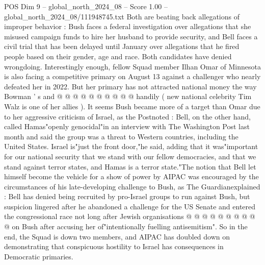 \begin{textsample}{POS Dim 9 – global\_north\_2024\_08 – Score 1.00 – global\_north\_2024\_08/111948745.txt}
Both are beating back allegations of improper behavior : Bush faces a federal investigation over allegations that she misused campaign funds to hire her husband to provide security, and Bell faces a civil trial that has been delayed until January over allegations that he fired people based on their gender, age and race.
Both candidates have denied wrongdoing.
Interestingly enough, fellow Squad member Ilhan Omar of Minnesota is also facing a competitive primary on August 13 against a challenger who nearly defeated her in 2022.
But her primary has not attracted national money the way Bowman ' s and @ @ @ @ @ @ @ @ @ @ handily ( new national celebrity Tim Walz is one of her allies ).
It seems Bush became more of a target than Omar due to her aggressive criticism of Israel, as the Postnoted : Bell, on the other hand, called Hamas"openly genocidal"in an interview with The Washington Post last month and said the group was a threat to Western countries, including the United States.
Israel is"just the front door,"he said, adding that it was"important for our national security that we stand with our fellow democracies, and that we stand against terror states, and Hamas is a terror state."The notion that Bell let himself become the vehicle for a show of power by AIPAC was encouraged by the circumstances of his late-developing challenge to Bush, as The Guardianexplained : Bell has denied being recruited by pro-Israel groups to run against Bush, but suspicion lingered after he abandoned a challenge for the US Senate and entered the congressional race not long after Jewish organisations @ @ @ @ @ @ @ @ @ @ on Bush after accusing her of"intentionally fuelling antisemitism".
So in the end, the Squad is down two members, and AIPAC has doubled down on demonstrating that conspicuous hostility to Israel has consequences in Democratic primaries.

\end{textsample}

